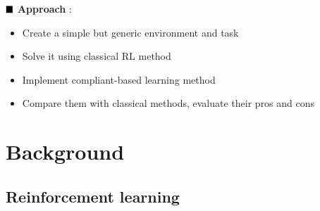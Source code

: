 \documentclass[t]{beamer}
\begin{document}
{{		\vspace{20pt}
		$\small\blacksquare$ \textbf{Approach} :
			\begin{itemize}
				\item Create a simple but generic environment and task 
				\item Solve it using classical RL method 
				\item Implement compliant-based learning method 
				\item Compare them with classical methods, evaluate their pros and cons 
			\end{itemize}
	}
}

\section{Background}
{
	\subsection{Reinforcement learning}
	{
		}}
\end{document}
